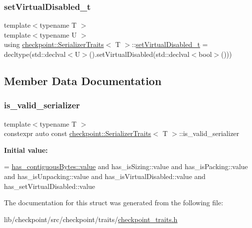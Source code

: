 \subsubsection{\texorpdfstring{set\+Virtual\+Disabled\+\_\+t}{setVirtualDisabled\_t}}
{\footnotesize\ttfamily template$<$typename T $>$ \\
template$<$typename U $>$ \\
using \hyperlink{structcheckpoint_1_1_serializer_traits}{checkpoint\+::\+Serializer\+Traits}$<$ T $>$\+::\hyperlink{structcheckpoint_1_1_serializer_traits_ac8e1715e588932dc8e4dc14130b6ca9e}{set\+Virtual\+Disabled\+\_\+t} =  decltype(std\+::declval$<$U$>$().set\+Virtual\+Disabled(std\+::declval$<$bool$>$()))}



\subsection{Member Data Documentation}
\mbox{\label{structcheckpoint_1_1_serializer_traits_a8818dc68069bcf67d4d2b43a9cd57026}} 
\subsubsection{\texorpdfstring{is\+\_\+valid\+\_\+serializer}{is\_valid\_serializer}}
{\footnotesize\ttfamily template$<$typename T $>$ \\
constexpr auto const \hyperlink{structcheckpoint_1_1_serializer_traits}{checkpoint\+::\+Serializer\+Traits}$<$ T $>$\+::is\+\_\+valid\+\_\+serializer\hspace{0.3cm}{\ttfamily [static]}}

{\bfseries Initial value\+:}
\begin{DoxyCode}
=
    \hyperlink{structdetection_1_1detector_a6d7d0e1bdf5903db9edbe448edccf83b}{has\_contiguousBytes::value} and
    has\_isSizing::value and
    has\_isPacking::value and
    has\_isUnpacking::value and
    has\_isVirtualDisabled::value and
    has\_setVirtualDisabled::value
\end{DoxyCode}


The documentation for this struct was generated from the following file\+:\begin{DoxyCompactItemize}
\item 
lib/checkpoint/src/checkpoint/traits/\hyperlink{checkpoint__traits_8h}{checkpoint\+\_\+traits.\+h}\end{DoxyCompactItemize}
